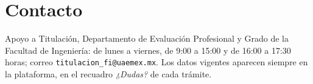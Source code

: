 \section{Contacto}
Apoyo a Titulación, Departamento de Evaluación Profesional y Grado de la Facultad de Ingeniería: de lunes a viernes, de 9:00 a 15:00 y de 16:00 a 17:30 horas; correo \texttt{titulacion\_fi@uaemex.mx}. Los datos vigentes aparecen siempre en la plataforma, en el recuadro \emph{¿Dudas?} de cada trámite.
